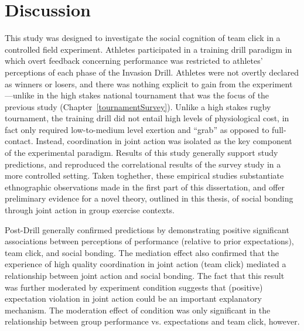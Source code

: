 \clearpage
\section{Discussion}
This study was designed to investigate the social cognition of team click in a controlled field experiment.  Athletes participated in a training drill paradigm in which overt feedback concerning performance was restricted to athletes' perceptions of each phase of the Invasion Drill.  Athletes were not overtly declared as winners or losers, and there was nothing explicit to gain from the experiment---unlike in the high stakes national tournament that was the focus of the previous study (Chapter~\ref{tournamentSurvey}).  Unlike a high stakes rugby tournament, the training drill did not entail high levels of physiological cost, in fact only required low-to-medium level exertion and ``grab'' as opposed to full-contact. Instead, coordination in joint action was isolated as the key component of the experimental paradigm.  Results of this study generally support study predictions, and reproduced the correlational results of the survey study in a more controlled setting. Taken toghether, these empirical studies substantiate ethnographic observations made in the first part of this dissertation, and offer preliminary evidence for a novel theory, outlined in this thesis, of social bonding through joint action in group exercise contexts.




Post-Drill generally confirmed predictions by demonstrating positive significant associations between perceptions of performance (relative to prior expectations), team click, and social bonding.  The mediation effect also confirmed that the experience of high quality coordination in joint action (team click) mediated a relationship between joint action and social bonding.  The fact that this result was further moderated by experiment condition suggests that (positive) expectation violation in joint action could be an important explanatory mechanism.  The moderation effect of condition was only significant in the relationship between group performance vs. expectations and team click, however.

